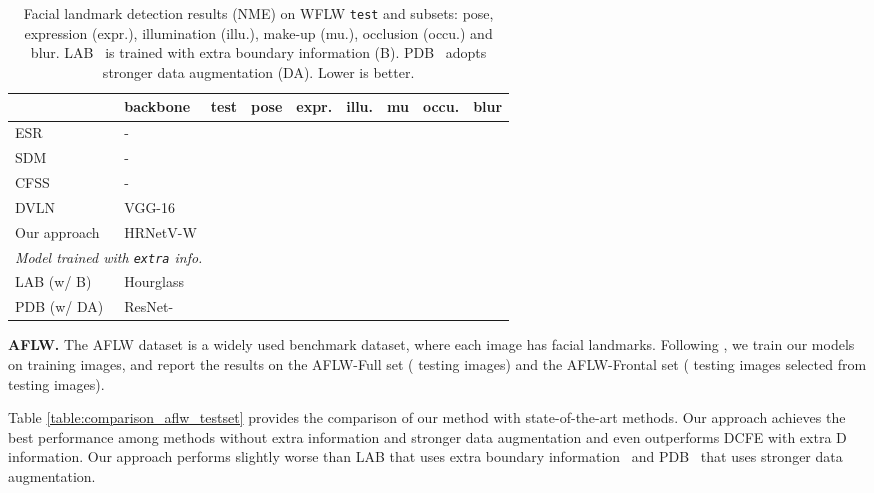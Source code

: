 \documentclass[10pt,twocolumn,letterpaper]{article}
\begin{document}
\renewcommand{\arraystretch}{1.3}
\begin{table}[t]
\scriptsize
\setlength{\tabcolsep}{0.5pt}
\centering
\caption{Facial landmark detection results
(NME) on WFLW \texttt{test} and  subsets:
pose,
expression (expr.),
illumination (illu.),
make-up (mu.),
occlusion (occu.)
and blur.
LAB~\cite{Wu0YWC018} is trained with extra boundary information (B).
PDB~\cite{FengKA0W18} adopts stronger data augmentation (DA).
Lower is better.}
\label{table:comparison_wflw_testset}
\begin{tabular}{l|l|r|r|r|r|r|r|r }
\hline \noalign{\smallskip}
   & backbone & test & pose & expr. & illu. & mu & occu. & blur\\
\hline

\hline
 ESR \cite{CaoWWS12}& - &  &  &  &  &  &  & \\
SDM \cite{XiongT13}& - & &  &  &  &  &  & \\
CFSS \cite{ZhuLLT15}& - & &  &  &  &  &  & \\
DVLN \cite{WuY17} & VGG-16& &  &  &  &  &  & \\
\hline
Our approach & HRNetV-W &  &  &  &  &  &  & \\
\hline

\hline
\multicolumn{3}{l}{
\emph {Model trained with \texttt{extra} info.}}\\
\hline
LAB (w/ B)~\cite{Wu0YWC018}& Hourglass &  &  &  &  &  &  & \\
PDB (w/ DA)~\cite{FengKA0W18}& ResNet- &  &  &  &  &  &  & \\
\hline
\end{tabular}
\end{table}

\vspace{.1cm}
\noindent\textbf{AFLW.}
The AFLW \cite{KostingerWRB11} dataset is
a widely used benchmark dataset,
where each image has  facial landmarks. Following \cite{ZhuLLT15, Wu0YWC018}, we train our models on  training images, and report the results on the AFLW-Full set ( testing images) and the AFLW-Frontal set ( testing images selected from  testing images).


Table \ref{table:comparison_aflw_testset} provides the comparison of our method with state-of-the-art methods.
Our approach achieves the best performance among methods without extra information and stronger data augmentation and even outperforms DCFE with extra D information.
Our approach performs slightly worse than
LAB that uses extra boundary information~\cite{Wu0YWC018}
and PDB~\cite{FengKA0W18}
that uses stronger data augmentation.
\end{document}
